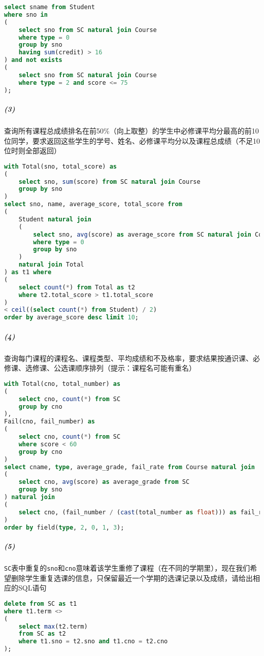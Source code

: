 \documentclass{article}
\begin{document}
\begin{lstlisting}[language = SQL]
select sname from Student
where sno in
(
    select sno from SC natural join Course
    where type = 0
    group by sno
    having sum(credit) > 16
) and not exists
(
    select sno from SC natural join Course
    where type = 2 and score <= 75
);
\end{lstlisting}

\subparagraph{(3)} 查询所有课程总成绩排名在前50\%（向上取整）的学生中必修课平均分最高的前10位同学，要求返回这些学生的学号、姓名、必修课平均分以及课程总成绩（不足10位时则全部返回）

\begin{lstlisting}[language = SQL]
with Total(sno, total_score) as
(
    select sno, sum(score) from SC natural join Course
    group by sno
)
select sno, name, average_score, total_score from
(
    Student natural join
    (
        select sno, avg(score) as average_score from SC natural join Course
        where type = 0
        group by sno
    )
    natural join Total
) as t1 where
(
    select count(*) from Total as t2
    where t2.total_score > t1.total_score
)
< ceil((select count(*) from Student) / 2)
order by average_score desc limit 10;
\end{lstlisting}

\subparagraph{(4)} 查询每门课程的课程名、课程类型、平均成绩和不及格率，要求结果按通识课、必修课、选修课、公选课顺序排列（提示：课程名可能有重名）

\begin{lstlisting}[language = SQL]
with Total(cno, total_number) as
(
    select cno, count(*) from SC
    group by cno
),
Fail(cno, fail_number) as
(
    select cno, count(*) from SC
    where score < 60
    group by cno
)
select cname, type, average_grade, fail_rate from Course natural join
(
    select cno, avg(score) as average_grade from SC
    group by sno
) natural join
(
    select cno, (fail_number / (cast(total_number as float))) as fail_rate from Total natural join Fail
)
order by field(type, 2, 0, 1, 3);
\end{lstlisting}


\subparagraph{(5)} \texttt{SC}表中重复的\texttt{sno}和\texttt{cno}意味着该学生重修了课程（在不同的学期里），现在我们希望删除学生重复选课的信息，只保留最近一个学期的选课记录以及成绩，请给出相应的SQL语句

\begin{lstlisting}[language = SQL]
delete from SC as t1
where t1.term <>
(
    select max(t2.term)
    from SC as t2
    where t1.sno = t2.sno and t1.cno = t2.cno
);
\end{lstlisting}
\end{document}
